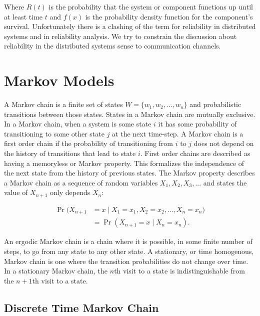 Where $R(t)$ is the probability that the system or component functions up until at least time $t$ and $f(x)$ is the probability density function for the component's survival.
Unfortunately there is a clashing of the term for reliability in distributed systems and in reliability analysis.
We try to constrain the discussion about reliability in the distributed systems sense to communication channels.

\section{Markov Models}


A Markov chain is a finite set of states $W=\{w_1, w_2, ..., w_n\}$ and probabilistic transitions between those states.
States in a Markov chain are mutually exclusive.
In a Markov chain, when a system is some state $i$ it has some probability of transitioning to some other state $j$ at the next time-step.
A Markov chain is a first order chain if the probability of transitioning from $i$ to $j$ does not depend on the history of transitions that lead to state $i$.
First order chains are described as having a memoryless or Markov property.
This formalizes the independence of the next state from the history of previous states.
The Markov property describes a Markov chain as a sequence of random variables $X_{1}, X_{2}, X_{3}, ...$ and states the value of $X_{n+1}$ only depends $X_{n}$: \cite{MARKOV3}

\begin{align} \Pr(X_{n+1}&=x\mid X_1=x_1, X_2=x_2, \ldots, X_n=x_n)
\nonumber \\ &= \Pr(X_{n+1}=x\mid X_n=x_n). \end{align}

An ergodic Markov chain is a chain where it is possible, in some finite number of steps, to go from any state to any other state.
A stationary, or time homogenous, Markov chain is one where the transition probabilities do not change over time.
In a stationary Markov chain, the $n$th visit to a state is indistinguishable from the $n+1$th visit to a state.

\subsection{Discrete Time Markov Chain}

